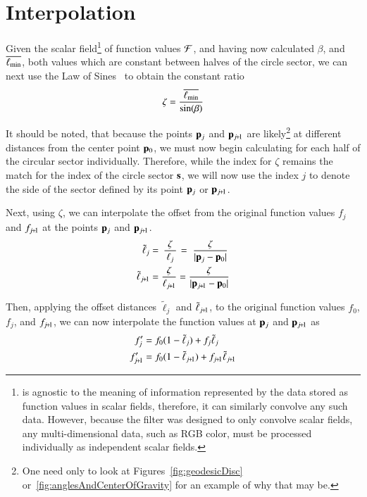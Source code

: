 \section{Interpolation}
\label{ch4sI}
Given the scalar field\footnote{ is agnostic to the meaning of information represented by the data stored as function values in scalar fields, therefore, it can similarly convolve any such data. However, because the filter was designed to only convolve scalar fields, any multi-dimensional data, such as RGB color, must be processed individually as independent scalar fields.} of function values $\mathcal{F}$, and having now calculated $\beta$, and $\overline{\ell_\text{min}}$, both values which are constant between halves of the circle sector, we can next use the Law of Sines~\cite{Weisstein19g} to obtain the constant ratio
%
\begin{equation}
	\zeta = \frac{\overline{\ell_\text{min}}}{\sin(\beta)}
	\label{eq:zeta}
\end{equation}%
%

It should be noted, that because the points $\mathbf{p}_j$ and $\bp_{\sjpo}$ are likely\footnote{One need only to look at Figures~\ref{fig:geodesicDisc} or~\ref{fig:anglesAndCenterOfGravity} for an example of why that may be.} at different distances from the center point $\mathbf{p}_0$, we must now begin calculating for each half of the circular sector individually. Therefore, while the index for $\zeta$ remains the match for the index of the circle sector $\mathbf{s}$, we will now use the index $j$ to denote the side of the sector defined by its point $\mathbf{p}_j$ or $\bp_{\sjpo}$.

Next, using $\zeta$, we can interpolate the offset from the original function values $f_j$ and $f_{\sjpo}$ at the points $\mathbf{p}_j$ and $\bp_{\sjpo}$.
\begin{align}
	\tilde{\ell}_j & = \kern2pt\frac{\zeta}{\kern2pt\ell_j\kern2pt}\kern1pt = \kern3pt\frac{\zeta}{|\bp_j - \bp_0|}
	\label{eq:distanceIForInterpolation}\\
	\tilde{\ell}_{\sjpo} & = \frac{\zeta}{\ell_{\sjpo}} = \frac{\zeta}{|\bp_{\sjpo} - \bp_0|}
	\label{eq:distanceIp1ForInterpolation}
\end{align}%
%

Then, applying the offset distances $\tilde{\ell}_j$ and $\tilde{\ell}_{\sjpo}$, to the original function values $f_0$, $f_j$, and $f_{\sjpo}$, we can now interpolate the function values at $\mathbf{p}_j$ and $\bp_{\sjpo}$ as
\begin{align}
	f'_j & = f_0(1 - \tilde{\ell}_j) + f_j\tilde{\ell}_j
	\label{eq:interpolatedFi} \\
	f'_{\sjpo} & = f_0(1 - \tilde{\ell}_{\sjpo}) + f_{\sjpo}\tilde{\ell}_{\sjpo}
	\label{eq:interpolatedFip1}
\end{align}%
%

